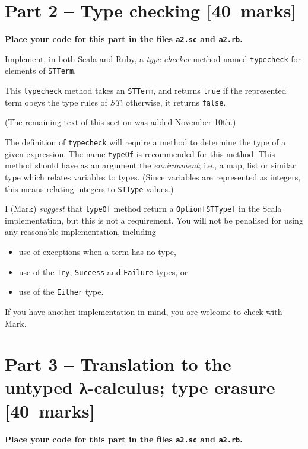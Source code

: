 \documentclass[11pt]{article}
\theoremstyle{definition}
\begin{document}
\section*{Part 2 – Type checking                                       [40 marks]}
\label{sec:orgbda316a}
\begin{center}
\textbf{Place your code for this part in the files \texttt{a2.sc} and \texttt{a2.rb}.}
\end{center}

Implement, in both Scala and Ruby,
a \emph{type checker} method named \texttt{typecheck} for elements of \texttt{STTerm}.

This \texttt{typecheck} method takes an \texttt{STTerm}, and returns \texttt{true} if
the represented term obeys the type rules of \emph{ST};
otherwise, it returns \texttt{false}.

(The remaining text of this section was added November 10th.)

The definition of \texttt{typecheck} will require a method to determine
the type of a given expression.
The name \texttt{typeOf} is recommended for this method.
This method should have as an argument the \emph{environment};
i.e., a map, list or similar type which relates variables to types. 
(Since variables are represented as integers,
this means relating integers to \texttt{STType} values.)

I (Mark) \emph{suggest} that \texttt{typeOf} method return a \texttt{Option[STType]} in the Scala implementation,
but this is not a requirement.
You will not be penalised for using any reasonable implementation,
including
\begin{itemize}
\item use of exceptions when a term has no type,
\item use of the \texttt{Try}, \texttt{Success} and \texttt{Failure} types, or
\item use of the \texttt{Either} type.
\end{itemize}
If you have another implementation in mind, you are welcome to check
with Mark.

\section*{Part 3 – Translation to the untyped λ-calculus; type erasure [40 marks]}
\label{sec:orgd044a3b}
\begin{center}
\textbf{Place your code for this part in the files \texttt{a2.sc} and \texttt{a2.rb}.}
\end{center}
\end{document}
